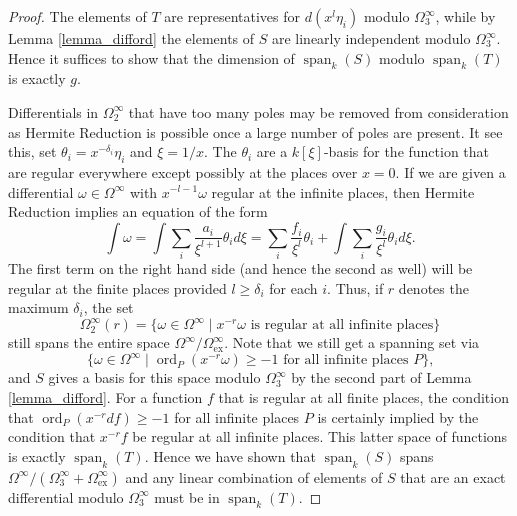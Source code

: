 \documentclass[12pt,reqno]{amsart}
\numberwithin{equation}{section}
\newcommand{\op}[1]  { \operatorname{ #1 }}
\begin{document}
\begin{proof}
The elements of $T$ are representatives for $d(x^l\eta_i)$ modulo $\Omega_3^{\infty}$, while by Lemma \ref{lemma_difford} the elements of $S$ are linearly independent modulo $\Omega_3^{\infty}$. Hence it suffices to show that the dimension of $\op{span}_{k}(S)$ modulo $\op{span}_{k}(T)$ is exactly $g$.

Differentials in $\Omega_2^{\infty}$ that have too many poles may be removed from consideration as Hermite Reduction is possible once a large number of poles are present. It see this, set $\theta_i = x^{-\delta_i} \eta_i$ and $\xi=1/x$. The $\theta_i$ are a $k[\xi]$-basis for the function that are regular everywhere except possibly at the places over $x=0$. If we are given a differential $\omega \in \Omega^{\infty}$ with $x^{-l-1} \omega$ regular at the infinite places, then Hermite Reduction implies an equation of the form
\begin{equation*}
\int \omega = \int \sum_i \frac{a_i}{\xi^{l+1}} \theta_i d \xi = \sum_i \frac{f_i}{\xi^{l}} \theta_i + \int \sum_i \frac{g_i}{\xi^{l}} \theta_i d \xi\text{.}
\end{equation*}
The first term on the right hand side (and hence the second as well) will be regular at the finite places provided $l \ge \delta_i $ for each $i$. Thus, if $r$ denotes the maximum $\delta_i$, the set
\begin{equation*}
 \Omega_{2}^{\infty}(r) = \{ \omega \in \Omega^{\infty} \mid x^{-r} \omega \text{ is regular at all infinite places}\}
\end{equation*}
still spans the entire space $\Omega^{\infty}/\Omega_{\op{ex}}^{\infty}$. Note that we still get a spanning set via
\begin{equation*}
 \{ \omega \in \Omega^{\infty} \mid \op{ord}_P(x^{-r} \omega) \ge -1 \text{ for all infinite places }P\}\text{,}
\end{equation*}
and $S$ gives a basis for this space modulo $\Omega_3^{\infty}$ by the second part of Lemma \ref{lemma_difford}. For a function $f$ that is regular at all finite places, the condition that $\op{ord}_P(x^{-r} df) \ge -1$ for all infinite places $P$ is certainly implied by the condition that $x^{-r} f$ be regular at all infinite places. This latter space of functions is exactly $\op{span}_{k}(T)$. Hence we have shown that $\op{span}_{k}(S)$ spans $\Omega^{\infty}/(\Omega_3^{\infty}+\Omega_{\op{ex}}^{\infty})$ and any linear combination of elements of $S$ that are an exact differential modulo $\Omega_3^{\infty}$ must be in $\op{span}_{k}(T)$.


\end{proof}
\end{document}
